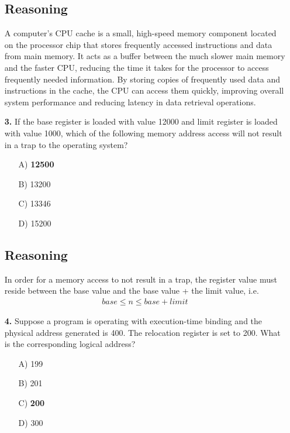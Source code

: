 \documentclass[12pt]{book}
\begin{document}
\begin{itemize}
        \subsection*{Reasoning}
        A computer's CPU cache is a small, high-speed memory component located on the processor chip that stores frequently accessed instructions and data from main memory. It acts as a buffer between the much slower main memory and the faster CPU, reducing the time it takes for the processor to access frequently needed information. By storing copies of frequently used data and instructions in the cache, the CPU can access them quickly, improving overall system performance and reducing latency in data retrieval operations.

        \item[\textbf{3.}] If the base register is loaded with value 12000 and limit register is loaded with value
        1000, which of the following memory address access will not result in a trap to the
        operating system?

        \begin{itemize}
            \item[A)] \textbf{12500}
            \item[B)] 13200
            \item[C)] 13346
            \item[D)] 15200
        \end{itemize}
        \subsection*{Reasoning}
        In order for a memory access to not result in a trap, the register value must reside between the base value and the base value + the limit value, i.e. 
        \begin{align*}
            base\leq n \leq base+limit
        \end{align*}

        \item[\textbf{4.}] Suppose a program is operating with execution-time binding and the physical address
        generated is 400. The relocation register is set to 200. What is the corresponding logical
        address?
        \begin{itemize}
            \item[A)] 199
            \item[B)] 201
            \item[C)] \textbf{200}
            \item[D)] 300
        \end{itemize}


\end{itemize}
\end{document}
